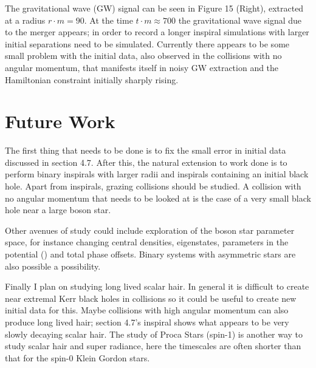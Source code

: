 The gravitational wave (GW) signal can be seen in Figure 15 (Right), extracted at a radius $r \cdot m = 90$. At the time $t \cdot m \approx 700$ the gravitational wave signal due to the merger appears; in order to record a longer inspiral simulations with larger initial separations need to be simulated. Currently there appears to be some small problem with the initial data, also observed in the collisions with no angular momentum, that manifests itself in noisy GW extraction and the Hamiltonian constraint initially sharply rising. 

\section{Future Work}
The first thing that needs to be done is to fix the small error in initial data discussed in section 4.7. After this, the natural extension to work done is to perform binary inspirals with larger radii and inspirals containing an initial black hole. Apart from inspirals, grazing collisions should be studied. A collision with no angular momentum that needs to be looked at is the case of a very small black hole near a large boson star.

Other avenues of study could include exploration of the boson star parameter space, for instance changing central densities, eigenstates, parameters in the potential () and total phase offsets. Binary systems with asymmetric stars are also possible a possibility. 

Finally I plan on studying long lived scalar hair. In general it is difficult to create near extremal Kerr black holes in collisions so it could be useful to create new initial data for this. Maybe collisions with high angular momentum can also produce long lived hair; section 4.7's inspiral shows what appears to be very slowly decaying scalar hair. The study of Proca Stars (spin-1) is another way to study scalar hair and super radiance, here the timescales are often shorter than that for the spin-0 Klein Gordon stars.


